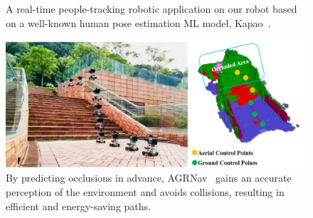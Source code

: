 \begin{figure}[!t]
    \centering
    \hfil
    \caption{A real-time people-tracking robotic application on our robot based on a well-known human pose estimation ML model, Kapao~\cite{kapao}.}
    \label{fig:kapao}
\end{figure}

\begin{figure}[!t]
    \centering
    \includegraphics[width=0.98\linewidth]{fig/agrnav.png}
    \caption{By predicting occlusions in advance, AGRNav~\cite{agrnav} gains an accurate perception of the environment and avoids collisions, resulting in efficient and energy-saving paths.}
    \label{fig:agrnav}
\end{figure}


